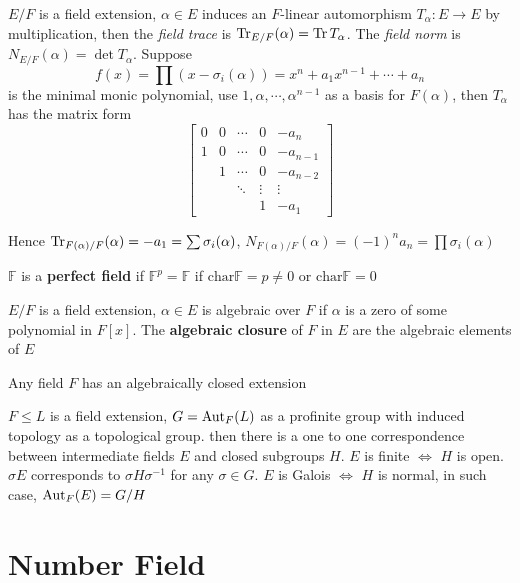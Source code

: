 \documentclass[main]{subfiles}
\begin{document}
\begin{definition}
$E/F$ is a field extension, $\alpha\in E$ induces an $F$-linear automorphism $T_\alpha:E\to E$ by multiplication, then the \textit{field trace} is $\operatorname{Tr}_{E/F}(\alpha)=\operatorname{Tr} T_\alpha$. The \textit{field norm} is $N_{E/F}(\alpha)=\det T_\alpha$. Suppose
\[f(x)=\prod(x-\sigma_i(\alpha))=x^n+a_1x^{n-1}+\cdots+a_n\]
is the minimal monic polynomial, use $1,\alpha,\cdots,\alpha^{n-1}$ as a basis for $F(\alpha)$, then $T_\alpha$ has the matrix form
\[\begin{bmatrix}
0& 0&\cdots&0&-a_n \\
1&0&\cdots&0&-a_{n-1} \\
&1&\cdots&0&-a_{n-2} \\
&&\ddots&\vdots&\vdots \\
&&&1&-a_1
\end{bmatrix}\]

Hence $\operatorname{Tr}_{F(\alpha)/F}(\alpha)=-a_1=\sum\sigma_i(\alpha)$, $N_{F(\alpha)/F}(\alpha)=(-1)^na_n=\prod\sigma_i(\alpha)$
\end{definition}

\begin{definition}
$\mathbb F$ is a \textbf{perfect field} if  $\mathbb F^p=\mathbb F$ if $\mathrm{char}\mathbb F=p\neq0$ or $\mathrm{char}\mathbb F=0$
\end{definition}

\begin{definition}
$E/F$ is a field extension, $\alpha\in E$ is algebraic over $F$ if $\alpha$ is a zero of some polynomial in $F[x]$. The \textbf{algebraic closure} of $F$ in $E$ are the algebraic elements of $E$
\end{definition}

\begin{theorem}
Any field $F$ has an algebraically closed extension
\end{theorem}

\begin{theorem}
$F\leq L$ is a field extension, $G=\operatorname{Aut}_F(L)$ as a profinite group with induced topology as a topological group. then there is a one to one correspondence between intermediate fields $E$ and closed subgroups $H$. $E$ is finite $\iff$ $H$ is open. $\sigma E$ corresponds to $\sigma H\sigma^{-1}$ for any $\sigma\in G$. $E$ is Galois $\iff$ $H$ is normal, in such case, $\operatorname{Aut}_F(E)=G/H$
\end{theorem}


\section{Number Field}
\end{document}
